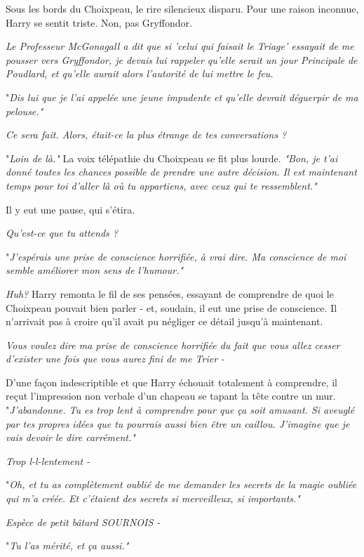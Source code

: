 Sous les bords du Choixpeau, le rire silencieux disparu. Pour une raison inconnue, Harry se sentit triste. Non, pas Gryffondor.

\emph{Le Professeur McGonagall a dit que si 'celui qui faisait le Triage' essayait de me pousser vers Gryffondor, je devais lui rappeler qu'elle serait un jour Principale de Poudlard, et qu'elle aurait alors l'autorité de lui mettre le feu.} 

"\emph{Dis lui que je l'ai appelée une jeune impudente et qu'elle devrait déguerpir de ma pelouse."} 

\emph{Ce sera fait. Alors, était-ce la plus étrange de tes conversations ?} 

"\emph{Loin de là."}  La voix télépathie du Choixpeau se fit plus lourde. \emph{"Bon, je t'ai donné toutes les chances possible de prendre une autre décision. Il est maintenant temps pour toi d'aller là où tu appartiens, avec ceux qui te ressemblent."} 

Il y eut une pause, qui s'étira.

\emph{Qu'est-ce que tu attends ?} 

"\emph{J'espérais une prise de conscience horrifiée, à vrai dire. Ma conscience de moi semble améliorer mon sens de l'humour."} 

\emph{Huh?}  Harry remonta le fil de ses pensées, essayant de comprendre de quoi le Choixpeau pouvait bien parler - et, soudain, il eut une prise de conscience. Il n'arrivait pas à croire qu'il avait pu négliger ce détail jusqu'à maintenant.

\emph{Vous voulez dire ma prise de conscience horrifiée du fait que vous allez cesser d'exister une fois que vous aurez fini de me Trier -} 

D'une façon indescriptible et que Harry échouait totalement à comprendre, il reçut l'impression non verbale d'un chapeau se tapant la tête contre un mur. "\emph{J'abandonne. Tu es trop lent à comprendre pour que ça soit amusant. Si aveuglé par tes propres idées que tu pourrais aussi bien être un caillou. J'imagine que je vais devoir le dire carrément."} 

\emph{Trop l-l-lentement -} 

"\emph{Oh, et tu as complètement oublié de me demander les secrets de la magie oubliée qui m'a créée. Et c'étaient des secrets si merveilleux, si importants."} 

\emph{Espèce de petit bâtard SOURNOIS -} 

"\emph{Tu l'as mérité, et ça aussi."} 

